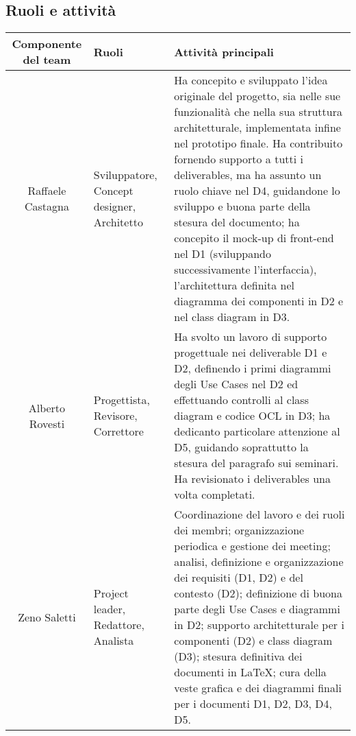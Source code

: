 \documentclass[11pt, a4paper]{article}
\theoremstyle{definition}
\begin{document}
\subsection{Ruoli e attività}
\begin{center}
  \footnotesize
  \begin{tabularx}{\textwidth}{|c||X||X|}
      \hline
      \cellcolor{red!70}Componente del team & \cellcolor{red!70}Ruoli & \cellcolor{red!70}Attività principali\\
      \hline
      Raffaele Castagna & Sviluppatore, Concept designer, Architetto& Ha concepito e sviluppato l'idea originale del progetto, sia nelle sue funzionalità che nella sua struttura architetturale, implementata infine nel prototipo finale. Ha contribuito fornendo supporto a tutti i deliverables, ma ha assunto un ruolo chiave nel D4, guidandone lo sviluppo e buona parte della stesura del documento; ha concepito il mock-up di front-end nel D1 (sviluppando successivamente l'interfaccia), l'architettura definita nel diagramma dei componenti in D2 e nel class diagram in D3.\\
      \hline
      Alberto Rovesti & Progettista, Revisore, Correttore & Ha svolto un lavoro di supporto progettuale nei deliverable D1 e D2, definendo i primi diagrammi degli Use Cases nel D2 ed effettuando controlli al class diagram e codice OCL in D3; ha dedicanto particolare attenzione al D5, guidando soprattutto la stesura del paragrafo sui seminari. Ha revisionato i deliverables una volta completati.\\
      \hline
      Zeno Saletti & Project leader, Redattore, Analista & Coordinazione del lavoro e dei ruoli dei membri; organizzazione periodica e gestione dei meeting; analisi, definizione e organizzazione dei requisiti (D1, D2) e del contesto (D2); definizione di buona parte degli Use Cases e diagrammi in D2; supporto architetturale per i componenti (D2) e class diagram (D3); stesura definitiva dei documenti in \LaTeX; cura della veste grafica e dei diagrammi finali per i documenti D1, D2, D3, D4, D5.\\
      \hline
  \end{tabularx}
\end{center}
\end{document}

